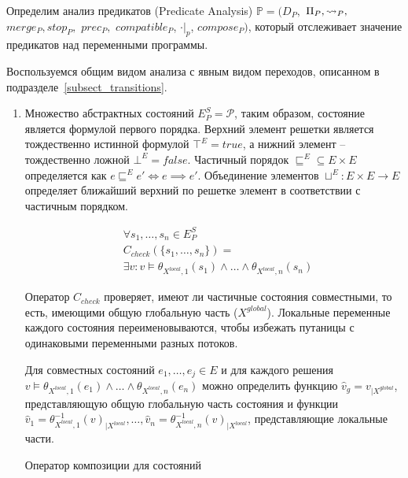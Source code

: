 Определим анализ предикатов (Predicate Analysis) $\mathbb{P}=(D_{P},$ $\Pi_{P}, \leadsto_{P},$ $merge_{P}, stop_{P},$ $prec_{P},$ $compatible_{P}$, $\cdot|_p$, $compose_P)$, который отслеживает значение предикатов над переменными программы.

Воспользуемся общим видом анализа с явным видом переходов, описанном в подразделе~\ref{subsect_transitions}.
 
\begin{enumerate}

\item 
Множество абстрактных состояний $E^S_P = \mathscr{P}$, таким образом, состояние является формулой первого порядка.
Верхний элемент решетки является тождественно истинной формулой
$\top^E = true$, а нижний элемент -- тождественно ложной $\bot^E = false$.
Частичный порядок $\sqsubseteq^E \subseteq E \times E$ определяется как $e \sqsubseteq^E e' \Leftrightarrow e \implies e'$.
Объединение элементов $\sqcup^E: E \times E \to E$ определяет ближайший верхний по решетке элемент в соответствии с частичным порядком.

\begin{equation}
\begin{aligned}
& \forall s_1, \dots, s_n \in E^S_P \\
& C_{check}(\{s_1,\dots, s_n\}) = \\
& \exists v: v \models \theta_{X^{local},1}(s_1) \land \dots \land \theta_{X^{local},n}(s_n)
\end{aligned}
\end{equation}

Оператор $C_{check}$ проверяет, имеют ли частичные состояния совместными, то есть, имеющими общую глобальную часть ($X^{global}$).
Локальные переменные каждого состояния переименовываются, чтобы избежать путаницы с одинаковыми переменными разных потоков.

Для совместных состояний $e_1, \dots, e_j \in E$ и для каждого решения 
$v \models \theta_{X^{local},1}(e_1) \land \dots \land \theta_{X^{local},n}(e_n)$
можно определить функцию $\hat v_g = v_{\mid X^{global}}$, представляющую общую глобальную часть состояния и функции $\hat v_1=\theta_{X^{local},1}^{-1}(v)_{\mid X^{local}}, \dots, \hat v_n=\theta_{X^{local},n}^{-1}(v)_{\mid X^{local}}$, представляющие локальные части.

Оператор композиции для состояний


\end{enumerate}
